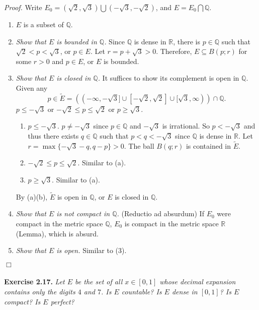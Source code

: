 \documentclass{article}
\begin{document}
\emph{Proof.}
Write $E_0 = (\sqrt{2},\sqrt{3}) \bigcup (-\sqrt{3},-\sqrt{2})$,
and $E = E_0 \bigcap \mathbb{Q}$.
\begin{enumerate}
\item[(1)]
$E$ is a subset of $\mathbb{Q}$.
\item[(2)]
\emph{Show that $E$ is bounded in $\mathbb{Q}$.}
Since $\mathbb{Q}$ is dense in $\mathbb{R}$,
there is $p \in \mathbb{Q}$ such that $\sqrt{2} < p < \sqrt{3}$, or $p \in E$.
Let $r = p + \sqrt{3} > 0$.
Therefore, $E \subseteq B(p;r)$ for some $r > 0$ and $p \in E$,
or $E$ is bounded.
\item[(3)]
\emph{Show that $E$ is closed in $\mathbb{Q}$.}
It suffices to show its complement is open in $\mathbb{Q}$.
Given any
$$p \in \widetilde{E}
= ((-\infty, -\sqrt{3}] \cup [-\sqrt{2},\sqrt{2}] \cup [\sqrt{3}, \infty)) \cap \mathbb{Q}.$$
$p \leq -\sqrt{3}$ or $-\sqrt{2} \leq p \leq \sqrt{2}$ or $p \geq \sqrt{3}$.
  \begin{enumerate}
  \item[(a)]
  $p \leq -\sqrt{3}$. $p \neq -\sqrt{3}$ since $p \in \mathbb{Q}$ and $-\sqrt{3}$ is irrational.
  So $p < -\sqrt{3}$ and thus there exists $q \in \mathbb{Q}$ such that $p < q < -\sqrt{3}$
  since $\mathbb{Q}$ is dense in $\mathbb{R}$.
  Let $r = \max\{-\sqrt{3} - q, q - p\} > 0$.
  The ball $B(q;r)$ is contained in $\widetilde{E}$.
  \item[(b)]
  $-\sqrt{2} \leq p \leq \sqrt{2}$. Similar to (a).
  \item[(c)]
  $p \geq \sqrt{3}$. Similar to (a).
  \end{enumerate}
  By (a)(b), $\widetilde{E}$ is open in $\mathbb{Q}$, or $E$ is closed in $\mathbb{Q}$.
\item[(4)]
\emph{Show that $E$ is not compact in $\mathbb{Q}$.}
(Reductio ad absurdum)
If $E_0$ were compact in the metric space $\mathbb{Q}$,
$E_0$ is compact in the metric space $\mathbb{R}$ (Lemma),
which is absurd.
\item[(5)]
\emph{Show that $E$ is open.}
Similar to (3).
\end{enumerate}
$\Box$ \\\\





\textbf{Exercise 2.17.}
\emph{Let $E$ be the set of all $x \in [0,1]$
whose decimal expansion contains only the digits $4$ and $7$.
Is $E$ countable? Is $E$ dense in $[0,1]$? Is $E$ compact? Is $E$ perfect?} \\
\end{document}
